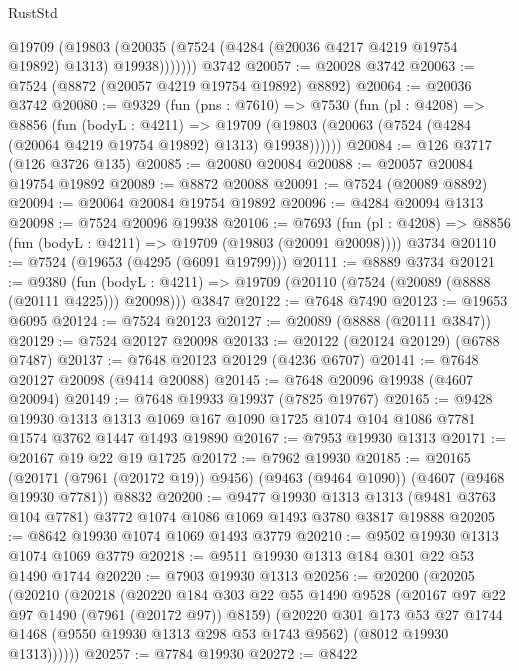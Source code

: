 \begin{lexlean}{RustStd}
\begin{coremodule}
          @19709
            (@19803 (@20035 (@7524 (@4284 (@20036 @4217 @4219 @19754 @19892) @1313) @19938)))))))
    @3742
@20057 := @20028 @3742
@20063 := @7524 (@8872 (@20057 @4219 @19754 @19892) @8892)
@20064 := @20036 @3742
@20080 := @9329
    (fun (pns : @7610) =>
    @7530
      (fun (pl : @4208) =>
      @8856
        (fun (bodyL : @4211) =>
        @19709 (@19803 (@20063 (@7524 (@4284 (@20064 @4219 @19754 @19892) @1313) @19938))))))
@20084 := @126 @3717 (@126 @3726 @135)
@20085 := @20080 @20084
@20088 := @20057 @20084 @19754 @19892
@20089 := @8872 @20088
@20091 := @7524 (@20089 @8892)
@20094 := @20064 @20084 @19754 @19892
@20096 := @4284 @20094 @1313
@20098 := @7524 @20096 @19938
@20106 := @7693
    (fun (pl : @4208) => @8856 (fun (bodyL : @4211) => @19709 (@19803 (@20091 @20098))))
    @3734
@20110 := @7524 (@19653 (@4295 (@6091 @19799)))
@20111 := @8889 @3734
@20121 := @9380
    (fun (bodyL : @4211) => @19709 (@20110 (@7524 (@20089 (@8888 (@20111 @4225))) @20098)))
    @3847
@20122 := @7648 @7490
@20123 := @19653 @6095
@20124 := @7524 @20123
@20127 := @20089 (@8888 (@20111 @3847))
@20129 := @7524 @20127 @20098
@20133 := @20122 (@20124 @20129) (@6788 @7487)
@20137 := @7648 @20123 @20129 (@4236 @6707)
@20141 := @7648 @20127 @20098 (@9414 @20088)
@20145 := @7648 @20096 @19938 (@4607 @20094)
@20149 := @7648 @19933 @19937 (@7825 @19767)
@20165 := @9428
    @19930
    @1313
    @1313
    @1069
    @167
    @1090
    @1725
    @1074
    @104
    @1086
    @7781
    @1574
    @3762
    @1447
    @1493
    @19890
@20167 := @7953 @19930 @1313
@20171 := @20167 @19 @22 @19 @1725
@20172 := @7962 @19930
@20185 := @20165
    (@20171 (@7961 (@20172 @19)) @9456)
    (@9463 (@9464 @1090))
    (@4607 (@9468 @19930 @7781))
    @8832
@20200 := @9477
    @19930
    @1313
    @1313
    (@9481 @3763 @104 @7781)
    @3772
    @1074
    @1086
    @1069
    @1493
    @3780
    @3817
    @19888
@20205 := @8642 @19930 @1074 @1069 @1493 @3779
@20210 := @9502 @19930 @1313 @1074 @1069 @3779
@20218 := @9511 @19930 @1313 @184 @301 @22 @53 @1490 @1744
@20220 := @7903 @19930 @1313
@20256 := @20200
    (@20205
      (@20210
        (@20218
          (@20220
            @184
            @303
            @22
            @55
            @1490
            @9528
            (@20167 @97 @22 @97 @1490 (@7961 (@20172 @97)) @8159)
            (@20220
              @301
              @173
              @53
              @27
              @1744
              @1468
              (@9550 @19930 @1313 @298 @53 @1743 @9562)
              (@8012 @19930 @1313))))))
@20257 := @7784 @19930
@20272 := @8422

\end{coremodule}
\end{lexlean}
